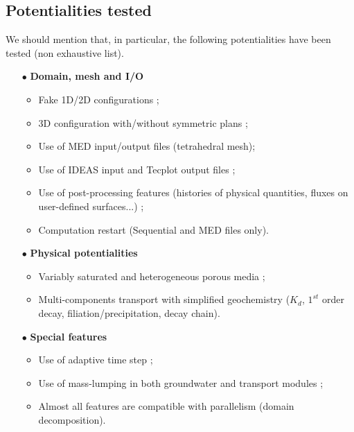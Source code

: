 \subsection{Potentialities tested}
\label{prg_potentialites_testees}%
We should mention that, in particular, the following potentialities have been tested (non exhaustive list).
%
\begin{itemize}
\item [$\bullet$]{\bf Domain, mesh and I/O} 
\begin{itemize}
  \item Fake 1D/2D configurations ;
  \item 3D configuration with/without symmetric plans ;
  \item Use of MED input/output files (tetrahedral mesh);
  \item Use of IDEAS input and Tecplot output files ;
  \item Use of post-processing features (histories of physical quantities, fluxes on user-defined surfaces...) ;
  \item Computation restart (Sequential and MED files only).
\end{itemize}
%
\item [$\bullet$]{\bf Physical potentialities} 
\begin{itemize}
  \item Variably saturated and heterogeneous porous media ;
  \item Multi-components transport with simplified geochemistry ($K_d$, $1^{st}$ order decay, filiation/precipitation, decay chain).
\end{itemize}
%
\item [$\bullet$]{\bf Special features} 
\begin{itemize}
  \item Use of adaptive time step ;
  \item Use of mass-lumping in both groundwater and transport modules ;
  \item Almost all features are compatible with parallelism (domain decomposition).
\end{itemize}
\end{itemize}


